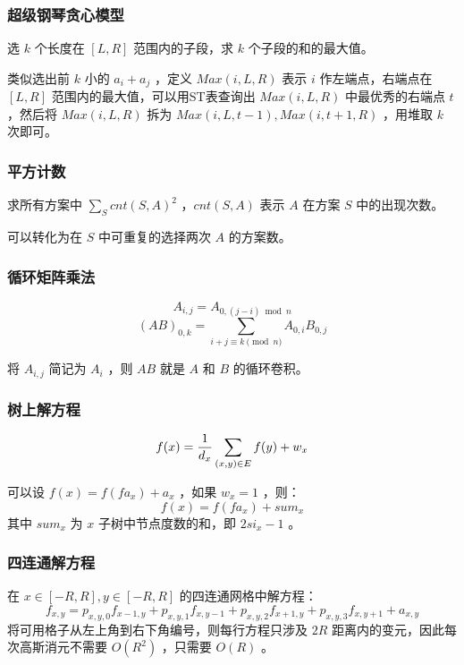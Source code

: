 \subsubsection{超级钢琴贪心模型}

选 $k$ 个长度在 $[L,R]$ 范围内的子段，求 $k$ 个子段的和的最大值。

类似选出前 $k$ 小的 $a_i+a_j$ ，定义 $Max(i,L,R)$ 表示 $i$ 作左端点，右端点在 $[L,R]$ 范围内的最大值，可以用ST表查询出 $Max(i,L,R)$ 中最优秀的右端点 $t$ ，然后将 $Max(i,L,R)$ 拆为 $Max(i,L,t-1),Max(i,t+1,R)$ ，用堆取 $k$ 次即可。


\subsubsection{平方计数}

求所有方案中 $\sum_{S} cnt(S,A)^2$ ，$cnt(S,A)$ 表示 $A$ 在方案 $S$ 中的出现次数。

可以转化为在 $S$ 中可重复的选择两次 $A$ 的方案数。

\subsubsection{循环矩阵乘法}

\vspace{-0.5cm}

$$
A_{i,j}=A_{0,(j-i)\bmod n}
$$
$$
(AB)_{0,k}=\sum_{i+j\equiv k\pmod n}A_{0,i}B_{0,j}
$$

将 $A_{i,j}$ 简记为 $A_i$ ，则 $AB$ 就是 $A$ 和 $B$ 的循环卷积。

\newpage

\subsubsection{树上解方程}

\vspace{-0.5cm}

$$
f(x)={1\over d_x}\sum_{(x,y)\in E}f(y)+w_x
$$

可以设 $f(x)=f(fa_x)+a_x$ ，如果 $w_x=1$ ，则：
$$
f(x)=f(fa_x)+sum_x
$$
其中 $sum_x$ 为 $x$ 子树中节点度数的和，即 $2si_x-1$ 。

\subsubsection{四连通解方程}

在 $x\in[-R,R],y\in [-R,R]$ 的四连通网格中解方程：
$$
f_{x,y}=p_{x,y,0}f_{x-1,y}+p_{x,y,1}f_{x,y-1}+p_{x,y,2}f_{x+1,y}+p_{x,y,3}f_{x,y+1}+a_{x,y}
$$
将可用格子从左上角到右下角编号，则每行方程只涉及 $2R$ 距离内的变元，因此每次高斯消元不需要 $O(R^2)$ ，只需要 $O(R)$ 。

